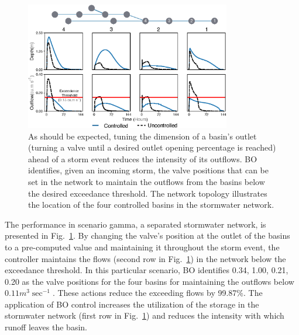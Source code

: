 \begin{figure}[ht]
	\includegraphics[width=0.8\textwidth]{gfx/Chapter-4/performance_gamma.eps}
	\caption{As should be expected, tuning the dimension of a basin's outlet (turning a valve until a desired outlet opening percentage is reached) ahead of a storm event reduces the intensity of its outflows.
	BO identifies, given an incoming storm, the valve positions that can be set in the network to maintain the outflows from the basins below the desired exceedance threshold.
	The network topology illustrates the location of the four controlled basins in the stormwater network.}\label{fig:gamma-4}
\end{figure}

The performance in scenario gamma, a separated stormwater network, is presented in Fig.~\ref{fig:gamma-4}.
By changing the valve's position at the outlet of the basins to a pre-computed value and maintaining it throughout the storm event, the controller maintains the flows (second row in Fig.~\ref{fig:gamma-4}) in the network below the exceedance threshold.
In this particular scenario, BO identifies 0.34, 1.00, 0.21, 0.20 as the  valve positions for the four basins for maintaining the outflows below $0.11 m^3\sec^{-1}$. These actions reduce the exceeding flows by 99.87\%.
The application of BO control increases the utilization of the storage in the stormwater network (first row in Fig.~\ref{fig:gamma-4}) and reduces the intensity with which runoff leaves the basin.


